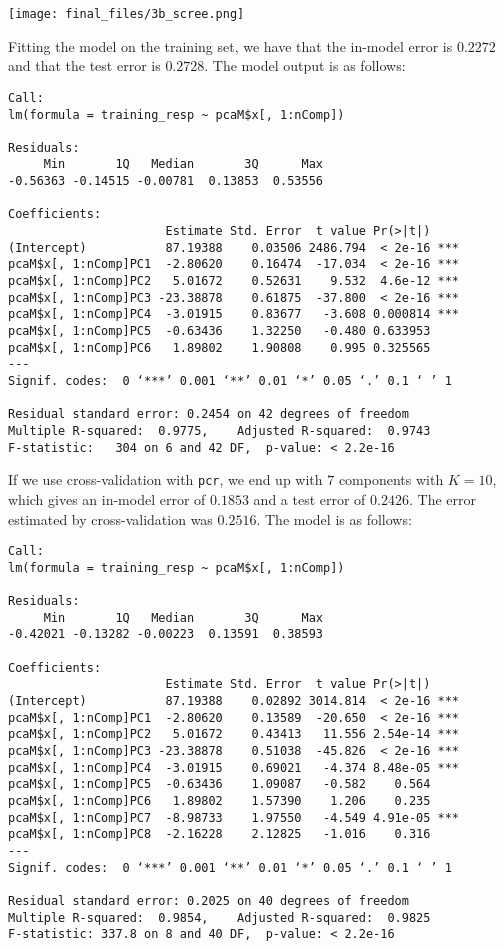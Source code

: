 \documentclass{article}
\begin{document}
\texttt{[image: final\_files/3b\_scree.png]}

Fitting the model on the training set, we have that the in-model error is $0.2272$ and that the test error is $0.2728$. The model output is as follows:

\begin{verbatim}
Call:
lm(formula = training_resp ~ pcaM$x[, 1:nComp])

Residuals:
     Min       1Q   Median       3Q      Max 
-0.56363 -0.14515 -0.00781  0.13853  0.53556 

Coefficients:
                      Estimate Std. Error  t value Pr(>|t|)    
(Intercept)           87.19388    0.03506 2486.794  < 2e-16 ***
pcaM$x[, 1:nComp]PC1  -2.80620    0.16474  -17.034  < 2e-16 ***
pcaM$x[, 1:nComp]PC2   5.01672    0.52631    9.532  4.6e-12 ***
pcaM$x[, 1:nComp]PC3 -23.38878    0.61875  -37.800  < 2e-16 ***
pcaM$x[, 1:nComp]PC4  -3.01915    0.83677   -3.608 0.000814 ***
pcaM$x[, 1:nComp]PC5  -0.63436    1.32250   -0.480 0.633953    
pcaM$x[, 1:nComp]PC6   1.89802    1.90808    0.995 0.325565    
---
Signif. codes:  0 ‘***’ 0.001 ‘**’ 0.01 ‘*’ 0.05 ‘.’ 0.1 ‘ ’ 1

Residual standard error: 0.2454 on 42 degrees of freedom
Multiple R-squared:  0.9775,    Adjusted R-squared:  0.9743 
F-statistic:   304 on 6 and 42 DF,  p-value: < 2.2e-16
\end{verbatim}
If we use cross-validation with \verb|pcr|, we end up with $7$ components with $K=10$, which gives an in-model error of $0.1853$ and a test error of $0.2426$. The error estimated by cross-validation was $0.2516$. The model is as follows:
\begin{verbatim}
Call:
lm(formula = training_resp ~ pcaM$x[, 1:nComp])

Residuals:
     Min       1Q   Median       3Q      Max 
-0.42021 -0.13282 -0.00223  0.13591  0.38593 

Coefficients:
                      Estimate Std. Error  t value Pr(>|t|)    
(Intercept)           87.19388    0.02892 3014.814  < 2e-16 ***
pcaM$x[, 1:nComp]PC1  -2.80620    0.13589  -20.650  < 2e-16 ***
pcaM$x[, 1:nComp]PC2   5.01672    0.43413   11.556 2.54e-14 ***
pcaM$x[, 1:nComp]PC3 -23.38878    0.51038  -45.826  < 2e-16 ***
pcaM$x[, 1:nComp]PC4  -3.01915    0.69021   -4.374 8.48e-05 ***
pcaM$x[, 1:nComp]PC5  -0.63436    1.09087   -0.582    0.564    
pcaM$x[, 1:nComp]PC6   1.89802    1.57390    1.206    0.235    
pcaM$x[, 1:nComp]PC7  -8.98733    1.97550   -4.549 4.91e-05 ***
pcaM$x[, 1:nComp]PC8  -2.16228    2.12825   -1.016    0.316    
---
Signif. codes:  0 ‘***’ 0.001 ‘**’ 0.01 ‘*’ 0.05 ‘.’ 0.1 ‘ ’ 1

Residual standard error: 0.2025 on 40 degrees of freedom
Multiple R-squared:  0.9854,    Adjusted R-squared:  0.9825 
F-statistic: 337.8 on 8 and 40 DF,  p-value: < 2.2e-16
\end{verbatim}
\end{document}

